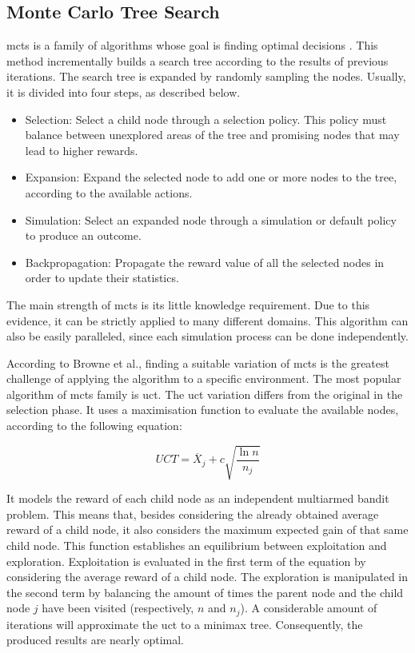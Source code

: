 \subsection{Monte Carlo Tree Search}


\gls{mcts} is a family of algorithms whose goal is finding optimal decisions \cite{Browne2012}.
This method incrementally builds a search tree according to the results of previous iterations.
The search tree is expanded by randomly sampling the nodes.
Usually, it is divided into four steps, as described below.
\begin{itemize}
  \item Selection: Select a child node through a selection policy. This policy must balance between unexplored areas of the tree and promising nodes that may lead to higher rewards.
  \item Expansion: Expand the selected node to add one or more nodes to the tree, according to the available actions.
  \item Simulation: Select an expanded node through a simulation or default policy to produce an outcome.
  \item Backpropagation: Propagate the reward value of all the selected nodes in order to update their statistics.
\end{itemize}


The main strength of \gls{mcts} is its little knowledge requirement.
Due to this evidence, it can be strictly applied to many different domains.
This algorithm can also be easily paralleled, since each simulation process can be done independently.


According to Browne et al., finding a suitable variation of \gls{mcts} is the greatest challenge of applying the algorithm to a specific environment.
The most popular algorithm of \gls{mcts} family is \gls{uct}.
The \gls{uct} variation differs from the original in the selection phase.
It uses a maximisation function to evaluate the available nodes, according to the following equation:

\begin{equation}
    UCT = \overline{X}_j + c\sqrt{\frac{\ln n}{n_j}}
\end{equation}

It models the reward of each child node as an independent multiarmed bandit problem.
This means that, besides considering the already obtained average reward of a child node, it also considers the maximum expected gain of that same child node.
This function establishes an equilibrium between exploitation and exploration.
Exploitation is evaluated in the first term of the equation by considering the average reward of a child node.
The exploration is manipulated in the second term by balancing the amount of times the parent node and the child node $j$ have been visited (respectively, $n$ and $n_j$).
A considerable amount of iterations will approximate the \gls{uct} to a minimax tree.
Consequently, the produced results are nearly optimal.

 